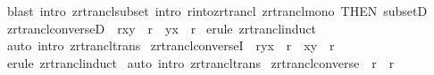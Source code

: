\begin{isabellebody}
%
\isadelimproof
%
\endisadelimproof
%
\isatagproof
{}\isamarkupfalse%
\ {\isacharparenleft}blast\ intro{\isacharbang}{\isacharcolon}\ zrtrancl{\isacharunderscore}subset\ intro{\isacharcolon}\ r{\isacharunderscore}into{\isacharunderscore}zrtrancl\ zrtrancl{\isacharunderscore}mono\ {\isacharbrackleft}THEN\ subsetD{\isacharbrackright}{\isacharparenright}\isanewline
{}\isamarkupfalse%
%
\endisatagproof
{\isafoldproof}%
%
\isadelimproof
\isanewline
%
\endisadelimproof
\isanewline
\isanewline
\isanewline
{}\isamarkupfalse%
\ zrtrancl{\isacharunderscore}converseD\ {\isacharcolon}\ {\isachardoublequoteopen}{\isacharbang}{\isacharbang}r{\isachardot}{\isacharparenleft}x{\isacharcomma}y{\isacharparenright}\ {\isacharcolon}\ {\isacharparenleft}r{\isacharpercent}{\isachartilde}{\isacharparenright}{\isacharpercent}{\isacharasterisk}\ {\isacharequal}{\isacharequal}{\isachargreater}\ {\isacharparenleft}y{\isacharcomma}x{\isacharparenright}\ {\isacharcolon}\ r{\isacharpercent}{\isacharasterisk}{\isachardoublequoteclose}\isanewline
%
\isadelimproof
%
\endisadelimproof
%
\isatagproof
{}\isamarkupfalse%
\ {\isacharparenleft}erule\ zrtrancl{\isacharunderscore}induct{\isacharparenright}\isanewline
{}\isamarkupfalse%
\ {\isacharparenleft}auto\ intro{\isacharcolon}\ zrtrancl{\isacharunderscore}trans{\isacharparenright}\isanewline
{}\isamarkupfalse%
%
\endisatagproof
{\isafoldproof}%
%
\isadelimproof
\isanewline
%
\endisadelimproof
\isanewline
{}\isamarkupfalse%
\ zrtrancl{\isacharunderscore}converseI\ {\isacharcolon}\ {\isachardoublequoteopen}{\isacharbang}{\isacharbang}r{\isachardot}{\isacharparenleft}y{\isacharcomma}x{\isacharparenright}\ {\isacharcolon}\ r{\isacharpercent}{\isacharasterisk}\ {\isacharequal}{\isacharequal}{\isachargreater}\ {\isacharparenleft}x{\isacharcomma}y{\isacharparenright}\ {\isacharcolon}\ {\isacharparenleft}r{\isacharcircum}{\isacharminus}{}{\isacharparenright}{\isacharpercent}{\isacharasterisk}{\isachardoublequoteclose}\isanewline
%
\isadelimproof
%
\endisadelimproof
%
\isatagproof
{}\isamarkupfalse%
\ {\isacharparenleft}erule\ zrtrancl{\isacharunderscore}induct{\isacharparenright}\isanewline
{}\isamarkupfalse%
\ {\isacharparenleft}auto\ intro{\isacharcolon}\ zrtrancl{\isacharunderscore}trans{\isacharparenright}\isanewline
{}\isamarkupfalse%
%
\endisatagproof
{\isafoldproof}%
%
\isadelimproof
\isanewline
%
\endisadelimproof
\isanewline
{}\isamarkupfalse%
\ zrtrancl{\isacharunderscore}converse\ {\isacharcolon}\ {\isachardoublequoteopen}{\isacharparenleft}{\isacharparenleft}r{\isacharpercent}{\isachartilde}{\isacharparenright}{\isacharpercent}{\isacharasterisk}{\isacharparenright}\ {\isacharequal}\ {\isacharparenleft}{\isacharparenleft}r{\isacharpercent}{\isacharasterisk}{\isacharparenright}{\isacharpercent}{\isachartilde}{\isacharparenright}{\isachardoublequoteclose}\isanewline

\end{isabellebody}
